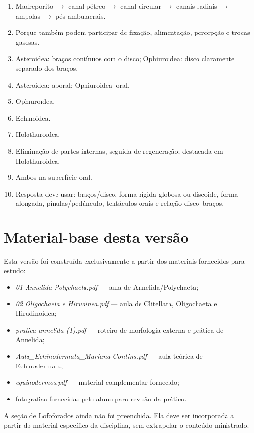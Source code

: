 \documentclass[a4paper,12pt]{article}
\begin{document}
\begin{enumerate}
  \item Madreporito $\rightarrow$ canal pétreo $\rightarrow$ canal circular $\rightarrow$ canais radiais $\rightarrow$ ampolas $\rightarrow$ pés ambulacrais.
  \item Porque também podem participar de fixação, alimentação, percepção e trocas gasosas.
  \item Asteroidea: braços contínuos com o disco; Ophiuroidea: disco claramente separado dos braços.
  \item Asteroidea: aboral; Ophiuroidea: oral.
  \item Ophiuroidea.
  \item Echinoidea.
  \item Holothuroidea.
  \item Eliminação de partes internas, seguida de regeneração; destacada em Holothuroidea.
  \item Ambos na superfície oral.
  \item Resposta deve usar: braços/disco, forma rígida globosa ou discoide, forma alongada, pínulas/pedúnculo, tentáculos orais e relação disco--braços.
\end{enumerate}

\section{Material-base desta versão}

Esta versão foi construída exclusivamente a partir dos materiais fornecidos para estudo:

\begin{itemize}
  \item \textit{01 Annelida Polychaeta.pdf} — aula de Annelida/Polychaeta;
  \item \textit{02 Oligochaeta e Hirudinea.pdf} — aula de Clitellata, Oligochaeta e Hirudinoidea;
  \item \textit{pratica-annelida (1).pdf} — roteiro de morfologia externa e prática de Annelida;
  \item \textit{Aula\_Echinodermata\_Mariana Contins.pdf} — aula teórica de Echinodermata;
  \item \textit{equinodermos.pdf} — material complementar fornecido;
  \item fotografias fornecidas pelo aluno para revisão da prática.
\end{itemize}

\begin{atencao}
A seção de Lofoforados ainda não foi preenchida. Ela deve ser incorporada a partir do material específico da disciplina, sem extrapolar o conteúdo ministrado.
\end{atencao}
\end{document}
